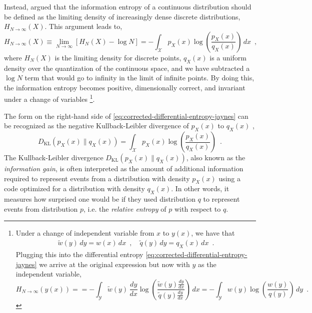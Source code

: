 Instead, \textcite{jaynes_information_1957,jaynes_prior_1968} argued that the information entropy of a continuous distribution should be defined as the limiting density of increasingly dense discrete distributions, $H_{N\rightarrow\infty}(X)$. This argument leads to,
%
\begin{equation} \label{eq:corrected-differential-entropy-jaynes}
    H_{N\rightarrow\infty}(X) \equiv \lim_{N\rightarrow\infty} [H_{N}(X) - \log N] = - \int_{\mathcal{X}} p_X(x) \log \left(\frac{p_X(x)}{q_X(x)}\right) \, dx \enspace ,
\end{equation}
%
where $H_N(X)$ is the limiting density for discrete points, $q_X(x)$ is a uniform density over the quantization of the continuous space, and we have subtracted a $\log N$ term that would go to infinity in the limit of infinite points.
By doing this, the information entropy becomes positive, dimensionally correct, and invariant under a change of variables%
\footnote{\label{fn:change-of-variables-invariance-of-corrected-differential-entropy}
    Under a change of independent variable from $x$ to $y(x)$, we have that
    \begin{align*}
        \widetilde{w}(y)\,dy = w(x)\,dx \enspace , \quad
        \widetilde{q}(y)\,dy = q_X(x)\,dx \enspace .
    \end{align*}
    Plugging this into the differential entropy \cref{eq:corrected-differential-entropy-jaynes} we arrive at the original expression but now with $y$ as the independent variable,
    \begin{equation*}
        H_{N\rightarrow\infty}(y(x)) =  = - \int_{\mathcal{Y}} \widetilde{w}(y)\,\frac{dy}{dx} \log \left( \frac{\widetilde{w}(y)\frac{dy}{dx}}{\widetilde{q}(y)\frac{dy}{dx}} \right) \, dx = - \int_{\mathcal{Y}} w(y) \log \left( \frac{w(y)}{q(y)} \right) \, dy \enspace .
    \end{equation*}
}.

The form on the right-hand side of \cref{eq:corrected-differential-entropy-jaynes} can be recognized as the negative Kullback-Leibler divergence of $p_X(x)$ to $q_X(x)$ \parencite{kullback_information_1959},
%
\begin{equation} \label{eq:kullback-leibler-divergence}
    D_{\mathrm{KL}}(p_X(x)\parallel q_X(x)) = \int_{\mathcal{X}} p_X(x) \log \left(\frac{p_X(x)}{q_X(x)}\right) \enspace .
\end{equation}
%
The Kullback-Leibler divergence $D_{\mathrm{KL}}(p_X(x)\parallel q_X(x))$, also known as the \emph{information gain}, is often interpreted as the amount of additional information required to represent events from a distribution with density $p_X(x)$ using a code optimized for a distribution with density $q_X(x)$. In other words, it measures how surprised one would be if they used distribution $q$ to represent events from distribution $p$, i.e. the \emph{relative entropy} of $p$ with respect to $q$.

